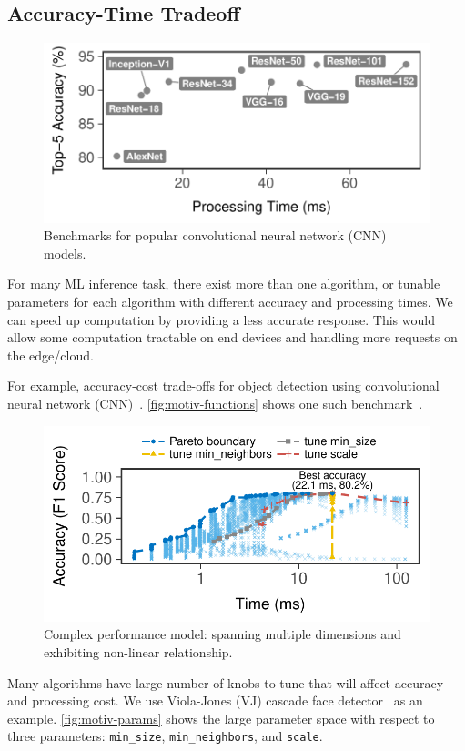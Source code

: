 \subsection{Accuracy-Time Tradeoff}
\label{sec:comp-perf-model}

\begin{figure}[t]
  \centering
  \includegraphics[width=.8\columnwidth]{figures/tradeoff-cnn.pdf}
  \caption{Benchmarks for popular convolutional neural network (CNN) models.}
  \label{fig:motiv-functions}
\end{figure}

For many ML inference task, there exist more than one algorithm, or tunable
parameters for each algorithm with different accuracy and processing times.  We
can speed up computation by providing a less accurate response. This would allow
some computation tractable on end devices and handling more requests on the
edge/cloud.

For example, accuracy-cost trade-offs for object detection using convolutional
neural network (CNN)~\cite{huang2016speed}. \autoref{fig:motiv-functions} shows
one such benchmark~\cite{cnn.benchmarks}.

\begin{figure}[t]
  \centering
  \includegraphics[width=.7\columnwidth]{figures/exhaustive-face.pdf}
  \caption{Complex performance model: spanning multiple dimensions and
    exhibiting non-linear relationship.}
  \label{fig:motiv-params}
\end{figure}

Many algorithms have large number of knobs to tune that will affect accuracy and
processing cost. We use Viola-Jones (VJ) cascade face
detector~\cite{viola2001rapid} as an example. \autoref{fig:motiv-params}
shows the large parameter space with respect to three parameters:
\texttt{min\_size}, \texttt{min\_neighbors}, and \texttt{scale}.

